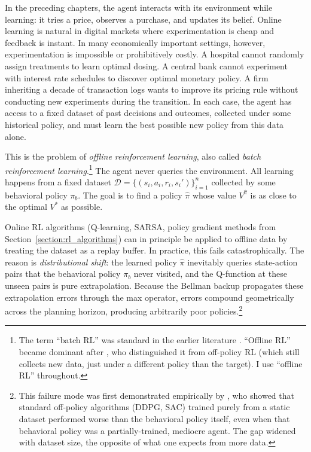 In the preceding chapters, the agent interacts with its environment while learning: it tries a price, observes a purchase, and updates its belief. Online learning is natural in digital markets where experimentation is cheap and feedback is instant. In many economically important settings, however, experimentation is impossible or prohibitively costly. A hospital cannot randomly assign treatments to learn optimal dosing. A central bank cannot experiment with interest rate schedules to discover optimal monetary policy. A firm inheriting a decade of transaction logs wants to improve its pricing rule without conducting new experiments during the transition. In each case, the agent has access to a fixed dataset of past decisions and outcomes, collected under some historical policy, and must learn the best possible new policy from this data alone.

This is the problem of \textit{offline reinforcement learning}, also called \textit{batch reinforcement learning}.\footnote{The term ``batch RL'' was standard in the earlier literature \citep{Ernst2005, Lange2012}. ``Offline RL'' became dominant after \citet{Levine2020}, who distinguished it from off-policy RL (which still collects new data, just under a different policy than the target). I use ``offline RL'' throughout.} The agent never queries the environment. All learning happens from a fixed dataset $\mathcal{D} = \{(s_i, a_i, r_i, s_i')\}_{i=1}^n$ collected by some behavioral policy $\pi_b$. The goal is to find a policy $\hat{\pi}$ whose value $V^{\hat{\pi}}$ is as close to the optimal $V^*$ as possible.

Online RL algorithms (Q-learning, SARSA, policy gradient methods from Section~\ref{section:rl_algorithms}) can in principle be applied to offline data by treating the dataset as a replay buffer. In practice, this fails catastrophically. The reason is \textit{distributional shift}: the learned policy $\hat{\pi}$ inevitably queries state-action pairs that the behavioral policy $\pi_b$ never visited, and the Q-function at these unseen pairs is pure extrapolation. Because the Bellman backup propagates these extrapolation errors through the max operator, errors compound geometrically across the planning horizon, producing arbitrarily poor policies.\footnote{This failure mode was first demonstrated empirically by \citet{Fujimoto2019}, who showed that standard off-policy algorithms (DDPG, SAC) trained purely from a static dataset performed worse than the behavioral policy itself, even when that behavioral policy was a partially-trained, mediocre agent. The gap widened with dataset size, the opposite of what one expects from more data.}

